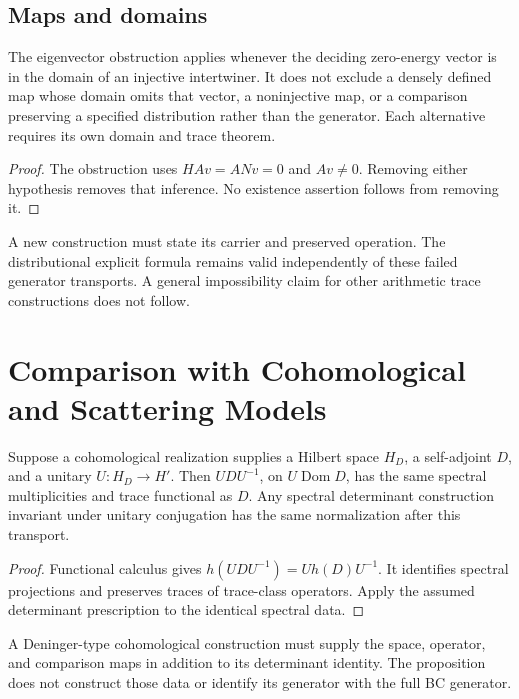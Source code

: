 \subsection{Maps and domains}
\label{v4-arith:w9-r4:residual:table}
\label{v4-arith:w9-r4:residual:why-irreducible}
\begin{proposition}
\label{v4-arith:w9-r4:thm:irreducibility}
The eigenvector obstruction applies whenever the deciding
zero-energy vector is in the domain of an injective intertwiner.
It does not exclude a densely defined map whose domain omits that
vector, a noninjective map, or a comparison preserving a
specified distribution rather than the generator.
Each alternative requires its own domain and trace theorem.
\end{proposition}
\begin{proof}
The obstruction uses \(HAv=ANv=0\) and \(Av\ne0\).
Removing either hypothesis removes that inference. No
existence assertion follows from removing it.
\end{proof}
\begin{remark}
\label{v4-arith:w9-r4:rem:beilinson-closure}
A new construction must state its carrier and preserved operation.
The distributional explicit formula remains valid independently
of these failed generator transports. A general impossibility
claim for other arithmetic trace constructions does not follow.
\end{remark}

\section{Comparison with Cohomological and Scattering Models}
\label{v4-arith:w9-r4:placement}
\label{v4-arith:w9-r4:placement:deninger}
\begin{proposition}
\label{v4-arith:w9-r4:prop:spectral-flow-eq-deninger}
Suppose a cohomological realization supplies a Hilbert space
\(H_D\), a self-adjoint \(D\), and a unitary \(U:H_D\to H'\).
Then \(UDU^{-1}\), on \(U\operatorname{Dom}D\), has the same
spectral multiplicities and trace functional as \(D\).
Any spectral determinant construction invariant under unitary
conjugation has the same normalization after this transport.
\end{proposition}
\begin{proof}
Functional calculus gives \(h(UDU^{-1})=Uh(D)U^{-1}\).
It identifies spectral projections and preserves traces of
trace-class operators. Apply the assumed determinant prescription
to the identical spectral data.
\end{proof}
\begin{remark}
\label{v4-arith:w9-r4:rem:deninger-renames}
A Deninger-type cohomological construction must supply the space,
operator, and comparison maps in addition to its determinant
identity. The proposition does not construct those data or
identify its generator with the full BC generator.
\end{remark}

